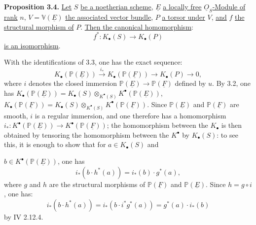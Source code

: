 \textbf{Proposition 3.4.} \uline{Let} $S$ \uline{be a noetherian scheme}, $\underline{E}$ \uline{a locally free} $\underline{O}_S$\uline{-Module of rank} $n$, $V=\mathbb V(\underline{E})$ \uline{the associated vector bundle}, $P$ \uline{a torsor under} $V$, \uline{and} $f$ \uline{the structural morphism of} $P$. \uline{Then the canonical homomorphism}:
\[
f^*:K_\bullet(S)\longrightarrow K_\bullet(P)
\]
\uline{is an isomorphism}.

With the identifications of 3.3, one has the exact sequence:
\[
K_\bullet(\mathbb P(\underline{E}))\xrightarrow{i_*}K_\bullet(\mathbb P(\underline{F}))\longrightarrow K_\bullet(P)\longrightarrow 0,
\tag{3.4.1}
\]
where $i$ denotes the closed immersion $\mathbb P(\underline{E})\to \mathbb P(\underline{F})$ defined by $u$. By 3.2, one has $K_\bullet(\mathbb P(\underline{E}))=K_\bullet(S)\otimes_{K^{\bullet}(S)}K^{\bullet}(\mathbb P(\underline{E}))$, $K_\bullet(\mathbb P(\underline{F}))=K_\bullet(S)\otimes_{K^{\bullet}(S)}K^{\bullet}(\mathbb P(\underline{F}))$.
Since $\mathbb P(\underline{E})$ and $\mathbb P(\underline{F})$ are smooth, $i$ is a regular immersion, and one therefore has a homomorphism $i_*:K^{\bullet}(\mathbb P(\underline{E}))\to K^{\bullet}(\mathbb P(\underline{F}))$; the homomorphism between the $K_\bullet$ is then obtained by tensoring the homomorphism between the $K^{\bullet}$ by $K_\bullet(S)$: to see this, it is enough to show that for $a\in K_\bullet(S)$ and


%

$b\in K^{\bullet}(\mathbb P(\underline{E}))$, one has
\[
i_*(b\cdot h^*(a))=i_*(b)\cdot g^*(a),
\]
where $g$ and $h$ are the structural morphisms of $\mathbb P(\underline{F})$ and $\mathbb P(\underline{E})$. Since $h=g\circ i$, one has:
\[
i_*(b\cdot h^*(a))=i_*(b\cdot i^*g^*(a))=g^*(a)\cdot i_*(b)
\]
by IV 2.12.4.

